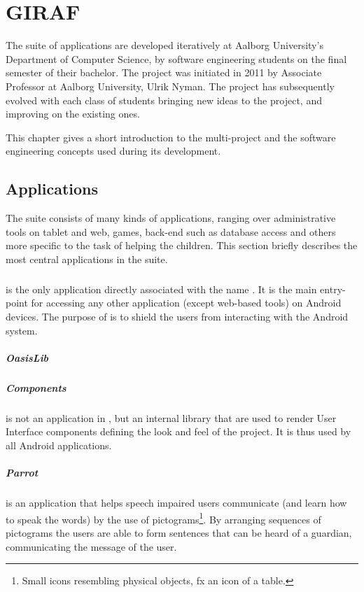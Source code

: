 \chapter{GIRAF}\label{chap:giraf}
The suite of \giraf applications are developed iteratively at Aalborg University's Department of Computer Science, by software engineering students on the final semester of their bachelor.
The project was initiated in 2011 by Associate Professor at Aalborg University, Ulrik Nyman.
The project has subsequently evolved with each class of students bringing new ideas to the project, and improving on the existing ones.

This chapter gives a short introduction to the \giraf multi-project and the software engineering concepts used during its development.

\section{\giraf Applications}\label{sec:giraf:applications}
The \giraf suite consists of many kinds of applications, ranging over administrative tools on tablet and web, games, back-end such as database access and others more specific to the task of helping the children.
This section briefly describes the most central applications in the \giraf suite.

\paragraph{\launcher}
is the only application directly associated with the name \giraf.
It is the main entry-point for accessing any other application (except web-based tools) on Android devices.
The purpose of \launcher is to shield the users from interacting with the Android system.

\paragraph{OasisLib}

\paragraph{\giraf Components}
is not an application in \giraf, but an internal library that are used to render User Interface components defining the look and feel of the project.
It is thus used by all Android applications.

\paragraph{Parrot}
is an application that helps speech impaired users communicate (and learn how to speak the words) by the use of pictograms\footnote{Small icons resembling physical objects, fx an icon of a table.}.
By arranging sequences of pictograms the users are able to form sentences that can be heard of a guardian, communicating the message of the user.

